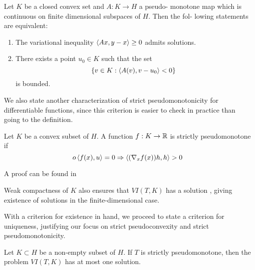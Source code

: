 \begin{theorem}
  \label{thm:existence}
  Let $K$ be a closed convex set and $A : K \to H$  a pseudo-
  monotone map which is continuous on finite dimensional subspaces of $H$. Then the fol-
  lowing statements are equivalent:
\end{theorem}
\begin{enumerate}
  \item The variational inequality $\left \langle Ax,y-x \right \rangle \geq 0$ admits solutions.
  \item There exists a point $u_0 \in K$ such that the set
  \begin{equation}
    \{v \in K : \left \langle A(v),v-u_0 \right \rangle < 0\}
  \end{equation}
  is bounded.
\end{enumerate}
We also state another characterization of strict pseudomonotonicity for differentiable functions, since this criterion is easier to check in practice than going to the definition.
  \begin{lemma}
  \label{lem:strict_pm}
  Let $K$ be a convex subset of $H$. A function $f: K \to \mathbb{R}$ is strictly pseudomonotone if
  \begin{equation}o
    \left \langle f(x),u \right \rangle = 0 \Rightarrow \left \langle (\nabla_x f(x))h,h \right \rangle > 0
  \end{equation}
\end{lemma}
A proof can be found in \citep[Proposition 2.8, p.96]{hadjisavvas2006handbook}

\begin{comment}

\citep[Theorem 3.6]{maugeri2009existence}, which we restate.
\begin{theorem}
  \label{thm:existence}
  Let $K\subset H$ be a closed convex set and $T:K\to H$ a pseudomonotone operator which is lower hemicontinuous along line segments, i.e. for all $x,y\in H$ the mapping $\xi \mapsto \ip{T\xi,}{x-y}$ is lower semicontinuous for $\xi \in \{\eta \in H : \eta = tx+(1-t)y, \quad t\in [0,1]\}$. Assume that there exists $u_0 \in K$ and $R> \norm{u_0}$ such that
  \begin{equation}
    \ip{Tv}{v-u_0} \geq 0, \forall v \in K \cap \{v \in H : \norm{v} = R \}
  \end{equation}
  then the variational inequality $VI(T,K)$ has a solution.
\end{theorem}
\end{comment}
\begin{remark}
  \label{rem:weak_compact}
  Weak compactness of $K$ also ensures that $VI(T,K)$ has a solution \citep[Theorem 12.1, P. 510]{hadjisavvas2006handbook}, giving existence of solutions in the finite-dimensional case.
\end{remark}
With a criterion for existence in hand, we proceed to state a criterion for uniqueness, justifying our focus on strict pseudoconvexity and strict pseudomonotonicity.
\begin{theorem}
  \label{thm:uniqueness}
  Let $K\subset H$ be a non-empty subset of $H$. If $T$ is strictly pseudomonotone, then the problem $VI(T,K)$ has at most one solution.
\end{theorem}
